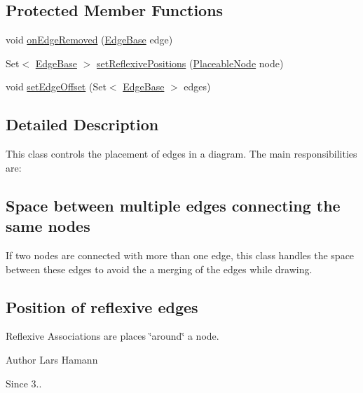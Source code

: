 \subsection*{Protected Member Functions}
\begin{DoxyCompactItemize}
\item 
void \hyperlink{classorg_1_1tzi_1_1use_1_1gui_1_1views_1_1diagrams_1_1_diagram_graph_a5771d14ff102361ccccb7b5d95326299}{on\-Edge\-Removed} (\hyperlink{classorg_1_1tzi_1_1use_1_1gui_1_1views_1_1diagrams_1_1elements_1_1edges_1_1_edge_base}{Edge\-Base} edge)
\item 
Set$<$ \hyperlink{classorg_1_1tzi_1_1use_1_1gui_1_1views_1_1diagrams_1_1elements_1_1edges_1_1_edge_base}{Edge\-Base} $>$ \hyperlink{classorg_1_1tzi_1_1use_1_1gui_1_1views_1_1diagrams_1_1_diagram_graph_a2e15d4f6f3dadd213854e6efeb337058}{set\-Reflexive\-Positions} (\hyperlink{classorg_1_1tzi_1_1use_1_1gui_1_1views_1_1diagrams_1_1elements_1_1_placeable_node}{Placeable\-Node} node)
\item 
void \hyperlink{classorg_1_1tzi_1_1use_1_1gui_1_1views_1_1diagrams_1_1_diagram_graph_a397eb82b41454cfc84e392a687a324a6}{set\-Edge\-Offset} (Set$<$ \hyperlink{classorg_1_1tzi_1_1use_1_1gui_1_1views_1_1diagrams_1_1elements_1_1edges_1_1_edge_base}{Edge\-Base} $>$ edges)
\end{DoxyCompactItemize}


\subsection{Detailed Description}
This class controls the placement of edges in a diagram. The main responsibilities are\-: \subsection*{Space between multiple edges connecting the same nodes}

If two nodes are connected with more than one edge, this class handles the space between these edges to avoid the a merging of the edges while drawing.

\subsection*{Position of reflexive edges}

Reflexive Associations are places \char`\"{}around\char`\"{} a node.

\begin{DoxyAuthor}{Author}
Lars Hamann 
\end{DoxyAuthor}
\begin{DoxySince}{Since}
3.. 
\end{DoxySince}


